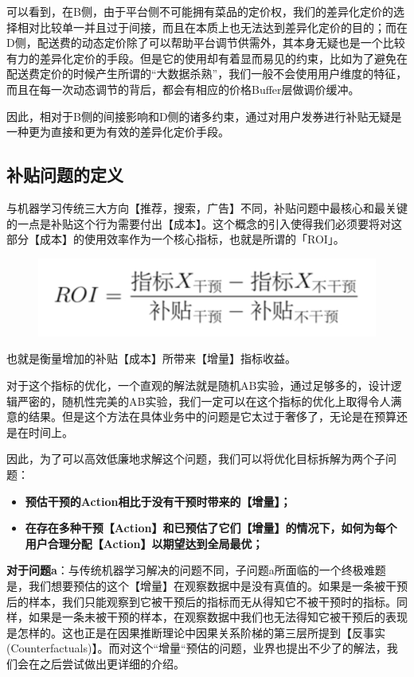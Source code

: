 \documentclass[12pt]{article}
\begin{document}
可以看到，在B侧，由于平台侧不可能拥有菜品的定价权，我们的差异化定价的选择相对比较单一并且过于间接，而且在本质上也无法达到差异化定价的目的；而在D侧，配送费的动态定价除了可以帮助平台调节供需外，其本身无疑也是一个比较有力的差异化定价的手段。但是它的使用却有着显而易见的约束，比如为了避免在配送费定价的时候产生所谓的“大数据杀熟”，我们一般不会使用用户维度的特征，而且在每一次动态调节的背后，都会有相应的价格Buffer层做调价缓冲。

因此，相对于B侧的间接影响和D侧的诸多约束，通过对用户发券进行补贴无疑是一种更为直接和更为有效的差异化定价手段。

\subsection{补贴问题的定义}
与机器学习传统三大方向【推荐，搜索，广告】不同，补贴问题中最核心和最关键的一点是补贴这个行为需要付出【成本】。这个概念的引入使得我们必须要将对这部分【成本】的使用效率作为一个核心指标，也就是所谓的「ROI」。
\begin{figure}[H]
    \centering
    \includegraphics[width=.6\textwidth]{fig/Causal_Inference_In_DiDi_4.png}
\end{figure}
也就是衡量增加的补贴【成本】所带来【增量】指标收益。

对于这个指标的优化，一个直观的解法就是随机AB实验，通过足够多的，设计逻辑严密的，随机性完美的AB实验，我们一定可以在这个指标的优化上取得令人满意的结果。但是这个方法在具体业务中的问题是它太过于奢侈了，无论是在预算还是在时间上。

因此，为了可以高效低廉地求解这个问题，我们可以将优化目标拆解为两个子问题：
\begin{itemize}
\setlength{\itemsep}{0pt}
\setlength{\parsep}{0pt}
\setlength{\parskip}{0pt}
    \item \textbf{预估干预的Action相比于没有干预时带来的【增量】；}
    \item \textbf{在存在多种干预【Action】和已预估了它们【增量】的情况下，如何为每个用户合理分配【Action】以期望达到全局最优；}
\end{itemize}

\textbf{对于问题a}：与传统机器学习解决的问题不同，子问题a所面临的一个终极难题是，我们想要预估的这个【增量】在观察数据中是没有真值的。如果是一条被干预后的样本，我们只能观察到它被干预后的指标而无从得知它不被干预时的指标。同样，如果是一条未被干预的样本，在观察数据中我们也无法得知它被干预后的表现是怎样的。这也正是在因果推断理论中因果关系阶梯的第三层所提到【反事实 (Counterfactuals)】。而对这个“增量“预估的问题，业界也提出不少了的解法，我们会在之后尝试做出更详细的介绍。
\end{document}
